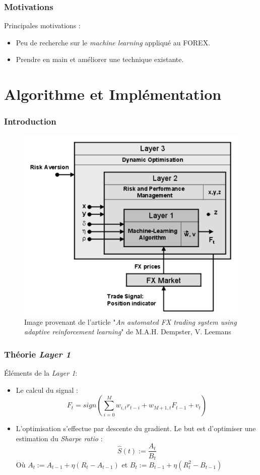 \documentclass{beamer}
\begin{document}
	\begin{frame}
		\frametitle{Motivations}
		Principales motivations :
		\begin{itemize}
			\item Peu de recherche sur le \textit{machine learning} appliqué au FOREX.
			\item Prendre en main et améliorer une technique existante.
		\end{itemize}
	\end{frame}
	
	\section{Algorithme et Implémentation}
	
	\begin{frame}
		\frametitle{Introduction}
		\begin{figure}
			\includegraphics[scale=0.3]{images/exemple_nn_projet}
			\caption[]{Image provenant de l'article "\textit{An automated FX trading system using adaptive reinforcement learning}" de M.A.H. Dempster, V. Leemans }
		\end{figure}
	\end{frame}

	\begin{frame}
		\frametitle{Théorie \textit{Layer 1}}
		Éléments de la \textit{Layer 1}:
		\begin{itemize}
			\item Le calcul du signal : $$F_t = sign(\sum_{i=0}^{M} w_{i,t}r_{t-i} + w_{M + 1,t}F_{t-1} + v_t)$$
			\item L'optimisation s'effectue par descente du gradient. Le but est d'optimiser une estimation du \textit{Sharpe ratio} : $$\widehat{S}(t):= \frac{A_t}{B_t}$$ Où $A_t := A_{t-1} + \eta (R_t -A_{t-1})$ et $B_t := B_{t-1} + \eta (R_t^2 -B_{t-1})$
		\end{itemize}
	\end{frame}
\end{document}
